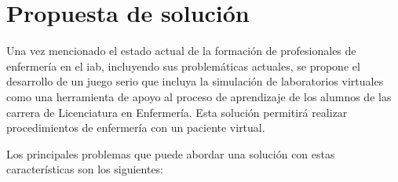 
\section{Propuesta de solución}
\label{sec:motivacion}

Una vez mencionado el estado actual de la formación de profesionales de
enfermería en el \gls{iab}, incluyendo sus problemáticas actuales, se propone el
desarrollo de un juego serio que incluya la simulación de laboratorios virtuales
como una herramienta de apoyo al proceso de aprendizaje de los alumnos de las
carrera de Licenciatura en Enfermería. Esta solución permitirá realizar
procedimientos de enfermería con un paciente virtual.

Los principales problemas que puede abordar una solución con estas
características son los siguientes:

